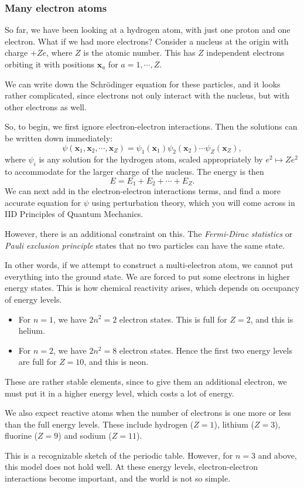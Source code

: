 \documentclass[a4paper]{article}
\begin{document}
\subsubsection*{Many electron atoms}
So far, we have been looking at a hydrogen atom, with just one proton and one electron. What if we had more electrons? Consider a nucleus at the origin with charge $+Ze$, where $Z$ is the atomic number. This has $Z$ independent electrons orbiting it with positions $\mathbf{x}_a$ for $a = 1, \cdots, Z$.

We can write down the Schr\"odinger equation for these particles, and it looks rather complicated, since electrons not only interact with the nucleus, but with other electrons as well.

So, to begin, we first ignore electron-electron interactions. Then the solutions can be written down immediately:
\[
  \psi(\mathbf{x}_1, \mathbf{x}_2, \cdots, \mathbf{x}_Z) = \psi_1(\mathbf{x}_1) \psi_2(\mathbf{x}_2) \cdots \psi_Z(\mathbf{x}_Z),
\]
where $\psi_i$ is any solution for the hydrogen atom, scaled appropriately by $e^2 \mapsto Z e^2$ to accommodate for the larger charge of the nucleus. The energy is then
\[
  E = E_1 + E_2 + \cdots + E_Z.
\]
We can next add in the electron-electron interactions terms, and find a more accurate equation for $\psi$ using perturbation theory, which you will come across in IID Principles of Quantum Mechanics.

However, there is an additional constraint on this. The \emph{Fermi-Dirac statistics} or \emph{Pauli exclusion principle} states that no two particles can have the same state.

In other words, if we attempt to construct a multi-electron atom, we cannot put everything into the ground state. We are forced to put some electrons in higher energy states. This is how chemical reactivity arises, which depends on occupancy of energy levels.
\begin{itemize}
  \item For $n = 1$, we have $2n^2 = 2$ electron states. This is full for $Z = 2$, and this is helium.
  \item For $n = 2$, we have $2n^2 = 8$ electron states. Hence the first two energy levels are full for $Z = 10$, and this is neon.
\end{itemize}
These are rather stable elements, since to give them an additional electron, we must put it in a higher energy level, which costs a lot of energy.

We also expect reactive atoms when the number of electrons is one more or less than the full energy levels. These include hydrogen ($Z = 1$), lithium ($Z = 3$), fluorine ($Z = 9$) and sodium ($Z = 11$).

This is a recognizable sketch of the periodic table. However, for $n = 3$ and above, this model does not hold well. At these energy levels, electron-electron interactions become important, and the world is not so simple.
\end{document}
